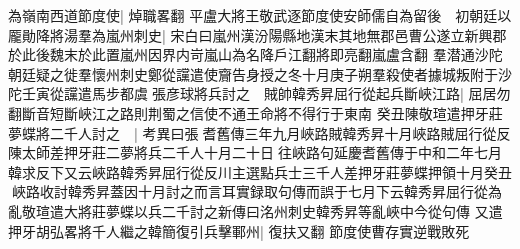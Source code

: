 為嶺南西道節度使|{
	焯職畧翻}
平盧大將王敬武逐節度使安師儒自為留後　初朝廷以龎勛降將湯羣為嵐州刺史|{
	宋白曰嵐州漢汾陽縣地漢末其地無郡邑曹公遂立新興郡於此後魏末於此置嵐州因界内岢嵐山為名降戶江翻將即亮翻嵐盧含翻}
羣潜通沙陀朝廷疑之徙羣懷州刺史鄭從讜遣使齎告身授之冬十月庚子朔羣殺使者據城叛附于沙陀壬寅從讜遣馬步都虞張彦球將兵討之　賊帥韓秀昇屈行從起兵斷峽江路|{
	屈居勿翻斷音短斷峽江之路則荆蜀之信使不通王命將不得行于東南}
癸丑陳敬瑄遣押牙莊夢蝶將二千人討之　|{
	考異曰張耆舊傳三年九月峽路賊韓秀昇十月峽路賊屈行從反陳太師差押牙莊二夢將兵二千人十月二十日往峽路句延慶耆舊傳于中和二年七月韓求反下又云峽路韓秀昇屈行從反川主選點兵士三千人差押牙莊夢蝶押領十月癸丑峽路收討韓秀昇蓋因十月討之而言耳實録取句傳而誤于七月下云韓秀昇屈行從為亂敬瑄遣大將莊夢蝶以兵二千討之新傳曰洺州刺史韓秀昇等亂峽中今從句傳}
又遣押牙胡弘畧將千人繼之韓簡復引兵擊鄆州|{
	復扶又翻}
節度使曹存實逆戰敗死

